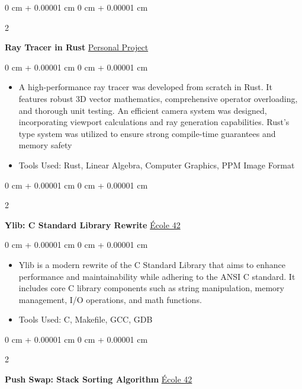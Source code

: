 \documentclass[10pt, letterpaper]{article}
\newenvironment{highlights}{
    \begin{itemize}[
        topsep=0.10 cm,
        parsep=0.10 cm,
        partopsep=0pt,
        itemsep=0pt,
        leftmargin=0 cm + 10pt
    ]
}{
    \end{itemize}
} %
\newenvironment{onecolentry}{
    \begin{adjustwidth}{
        0 cm + 0.00001 cm
    }{
        0 cm + 0.00001 cm
    }
}{
    \end{adjustwidth}
} %
\newenvironment{twocolentry}[2][]{
    \onecolentry
    \def\secondColumn{#2}
    \setcolumnwidth{\fill, 4.5 cm}
    \begin{paracol}{2}
}{
    \switchcolumn \raggedleft \secondColumn
    \end{paracol}
    \endonecolentry
} %
\begin{document}
        \begin{twocolentry}{
            \href{https://github.com/yuann3/RayRust}{Personal Project}
        }
            \textbf{Ray Tracer in Rust}\end{twocolentry}

        \vspace{0.10 cm}
        \begin{onecolentry}
            \begin{highlights}
                \item A high-performance ray tracer was developed from scratch in Rust. It features robust 3D vector mathematics, comprehensive operator overloading, and thorough unit testing. An efficient camera system was designed, incorporating viewport calculations and ray generation capabilities. Rust's type system was utilized to ensure strong compile-time guarantees and memory safety
                \item Tools Used: Rust, Linear Algebra, Computer Graphics, PPM Image Format
            \end{highlights}
        \end{onecolentry}

        \vspace{0.2 cm}

        \begin{twocolentry}{
            \href{https://github.com/yuann3/Ylib}{École 42}
        }
            \textbf{Ylib: C Standard Library Rewrite}\end{twocolentry}

        \vspace{0.10 cm}
        \begin{onecolentry}
            \begin{highlights}
                \item Ylib is a modern rewrite of the C Standard Library that aims to enhance performance and maintainability while adhering to the ANSI C standard. It includes core C library components such as string manipulation, memory management, I/O operations, and math functions.
                \item Tools Used: C, Makefile, GCC, GDB
            \end{highlights}
        \end{onecolentry}

        \vspace{0.2 cm}

        \begin{twocolentry}{
            \href{https://github.com/yuann3/push_swap}{École 42}
        }
            \textbf{Push Swap: Stack Sorting Algorithm}\end{twocolentry}
\end{document}
